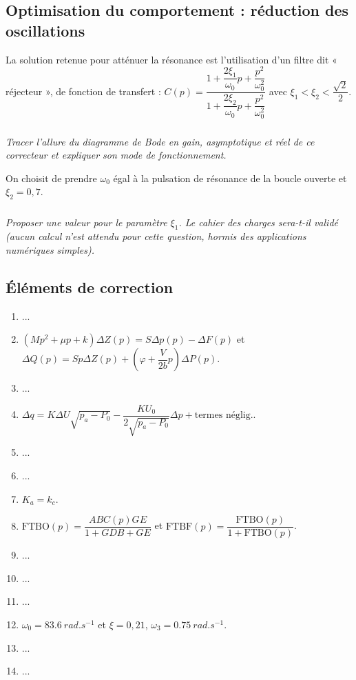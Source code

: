 \documentclass[10pt,fleqn]{article} %
\begin{document}
\begin{multicols}{2}
\subsection*{Optimisation du comportement : réduction des oscillations}
La solution retenue pour atténuer la résonance est l’utilisation d’un filtre dit « réjecteur », de
fonction de transfert :
$C(p)=\dfrac{1+\dfrac{2\xi_1}{\omega_0}p+\dfrac{p^2}{\omega_0^2}}{1+\dfrac{2\xi_2}{\omega_0}p+\dfrac{p^2}{\omega_0^2}}$ avec $\xi_1 < \xi_2 < \dfrac{\sqrt{2}}{2}$.

\subparagraph{}\textit{Tracer l’allure du diagramme de Bode en gain, asymptotique et réel de ce correcteur et
expliquer son mode de fonctionnement.}
\ifprof
\begin{corrige}
\end{corrige}
\else
\fi

On choisit de prendre $\omega_0$ égal à la pulsation de résonance de la boucle ouverte et $\xi_2 = 0,7$.


\subparagraph{}\textit{Proposer une valeur pour le paramètre $\xi_1$. Le cahier des charges sera-t-il validé (aucun
calcul n’est attendu pour cette question, hormis des applications numériques simples).}
\ifprof
\begin{corrige}
\end{corrige}
\else
\fi




\subsection*{Éléments de correction}
\begin{enumerate}
\item ...
\item $\left(Mp^2+\mu p + k \right)\Delta Z(p) = S\Delta p (p)-\Delta F(p)$ et $\Delta Q(p)=S p \Delta Z(p) + \left( \varphi + \dfrac{V}{2b} p \right) \Delta P(p)$.
\item ...
\item $\Delta q = K\Delta U\sqrt{p_a - P_0} - \dfrac{KU_0}{2\sqrt{p_a - P_0}}\Delta p + \text{termes néglig.}$.
\item ...
\item ...
\item $K_a = k_c$.
\item $\text{FTBO}(p)=\dfrac{ABC(p)GE}{1+GDB+GE}$ et $\text{FTBF}(p)=\dfrac{\text{FTBO}(p)}{1+\text{FTBO}(p)}$.
\item ...
\item ...
\item ...
\item $\omega_0=\SI{83,6}{rad.s^{-1}}$ et $\xi=0,21$, $\omega_3 = \SI{0,75}{rad.s^{-1}}$.
\item ...
\item ...
\end{enumerate}
\end{multicols}
\end{document}
